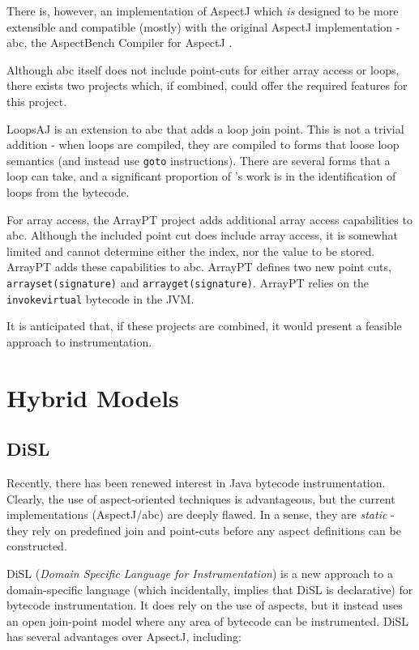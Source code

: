 		There is, however, an implementation of AspectJ which \emph{is} designed to be more extensible and compatible (mostly) with the original AspectJ implementation - abc, the AspectBench Compiler for AspectJ \citep{Allan2005}.
		
		Although abc itself does not include point-cuts for either array access or loops, there exists two projects which, if combined, could offer the required features for this project.
		
		LoopsAJ \citep{Harbulot2005} is an extension to abc that adds a loop join point. This is not a trivial addition - when loops are compiled, they are compiled to forms that loose loop semantics (and instead use \texttt{goto} instructions). There are several forms that a loop can take, and a significant proportion of \citeauthor{Harbulot2005}'s work is in the identification of loops from the bytecode.
				
		For array access, the ArrayPT project \citep{Chen2007} adds additional array access capabilities to abc. Although the included point cut does include array access, it is somewhat limited and cannot determine either the index, nor the value to be stored. ArrayPT adds these capabilities to abc. ArrayPT defines two new point cuts, \texttt{arrayset(signature)} and \texttt{arrayget(signature)}. ArrayPT relies on the \texttt{invokevirtual} bytecode in the JVM.
		
		It is anticipated that, if these projects are combined, it would present a feasible approach to instrumentation.
		

\section{Hybrid Models} \label{sec:instrumentation/hybrid}
	\subsection{DiSL} \label{sec:instrumentation/hybrid/disl}
	Recently, there has been renewed interest in Java bytecode instrumentation. Clearly, the use of aspect-oriented techniques is advantageous, but the current implementations (AspectJ/abc) are deeply flawed. In a sense, they are \textit{static} - they rely on predefined join and point-cuts before any aspect definitions can be constructed.
	
	DiSL (\textit{Domain Specific Language for Instrumentation}) \citep{Marek2012} is a new approach to a domain-specific language (which incidentally, implies that DiSL is declarative) for bytecode instrumentation. It does rely on the use of aspects, but it instead uses an open join-point model where any area of bytecode can be instrumented. DiSL has several advantages over ApsectJ, including:
	
